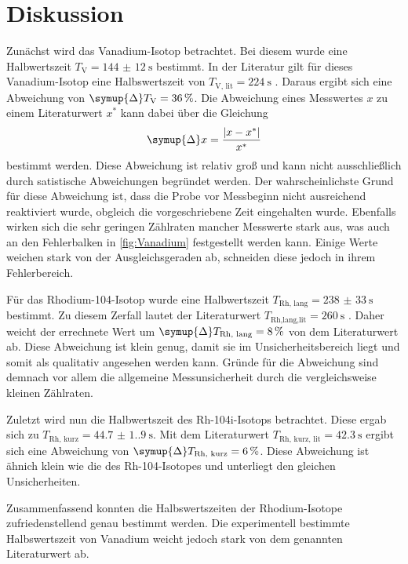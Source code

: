 \section{Diskussion}
\label{sec:Diskussion}
Zunächst wird das Vanadium-Isotop betrachtet. Bei diesem wurde eine Halbwertszeit $T_{\text{V}} = \qty{144(12)}{\second}$ bestimmt. In der Literatur gilt für dieses 
Vanadium-Isotop eine Halbswertszeit von $T_\text{V, lit} = \qty{224}{\second}$ \cite{Zerfall}. Daraus ergibt sich eine Abweichung von $\symup{\Delta}T_{\text{V}} = \qty{36}{\percent}$.
Die Abweichung eines Messwertes $x$ zu einem Literaturwert $x^*$ kann dabei über die Gleichung
\begin{equation}
    \symup{\Delta}x = \frac{|x - x^*|}{x^*}
\end{equation}
bestimmt werden.
Diese Abweichung ist relativ groß und kann nicht ausschließlich durch satistische Abweichungen begründet werden. Der wahrscheinlichste Grund für diese Abweichung ist, dass 
die Probe vor Messbeginn nicht ausreichend reaktiviert wurde, obgleich die vorgeschriebene Zeit eingehalten wurde. Ebenfalls wirken sich die sehr geringen Zählraten mancher
Messwerte stark aus, was auch an den Fehlerbalken in \autoref{fig:Vanadium} festgestellt werden kann. Einige Werte weichen stark von der Ausgleichsgeraden ab, schneiden diese 
jedoch in ihrem Fehlerbereich. 


Für das Rhodium-104-Isotop wurde eine Halbwertszeit $T_\text{Rh, lang} = \qty{238(33)}{\second}$ bestimmt. Zu diesem Zerfall lautet der Literaturwert 
$T_\text{Rh,lang,lit} = \qty{260}{\second}$ \cite{Zerfall}. Daher weicht der errechnete Wert um $\symup{\Delta}T_\text{Rh, lang} = \qty{8}{\percent}$ von dem Literaturwert ab.
Diese Abweichung ist klein genug, damit sie im Unsicherheitsbereich liegt und somit als qualitativ angesehen werden kann. Gründe für die Abweichung sind demnach vor allem 
die allgemeine Messunsicherheit durch die vergleichsweise kleinen Zählraten.

Zuletzt wird nun die Halbwertszeit des Rh-104i-Isotops betrachtet. Diese ergab sich zu $T_\text{Rh, kurz} = \qty{44.7(1.9)}{\second}$. Mit dem Literaturwert 
$T_\text{Rh, kurz, lit} = \qty{42.3}{\second}$ \cite{104iRh} ergibt sich eine Abweichung von $\symup{\Delta}T_\text{Rh, kurz} = \qty{6}{\percent}$. Diese Abweichung ist ähnich klein wie die 
des Rh-104-Isotopes und unterliegt den gleichen Unsicherheiten.

Zusammenfassend konnten die Halbswertszeiten der Rhodium-Isotope zufriedenstellend genau bestimmt werden. Die experimentell bestimmte Halbswertszeit von Vanadium
weicht jedoch stark von dem genannten Literaturwert ab.
